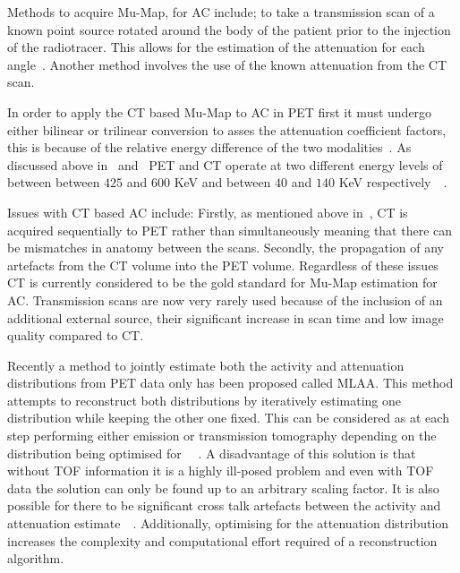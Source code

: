                 Methods to acquire \gls{Mu-Map}, for \gls{AC} include; to take a transmission scan of a known point source rotated around the body of the patient prior to the injection of the radiotracer. This allows for the estimation of the attenuation for each angle~. Another method involves the use of the known attenuation from the \gls{CT} scan.
                
                In order to apply the \gls{CT} based \gls{Mu-Map} to \gls{AC} in \gls{PET} first it must undergo either bilinear or trilinear conversion to asses the attenuation coefficient factors, this is because of the relative energy difference of the two modalities~. As discussed above in~ and~ \gls{PET} and \gls{CT} operate at two different energy levels of between between $425$ and $600$ \gls{KeV} and between $40$ and $140$ \gls{KeV} respectively~~.
                
                Issues with \gls{CT} based \gls{AC} include: Firstly, as mentioned above in~, \gls{CT} is acquired sequentially to \gls{PET} rather than simultaneously meaning that there can be mismatches in anatomy between the scans. Secondly, the propagation of any artefacts from the \gls{CT} volume into the \gls{PET} volume. Regardless of these issues \gls{CT} is currently considered to be the gold standard for \gls{Mu-Map} estimation for \gls{AC}. Transmission scans are now very rarely used because of the inclusion of an additional external source, their significant increase in scan time and low image quality compared to \gls{CT}. 
                
                Recently a method to jointly estimate both the activity and attenuation distributions from \gls{PET} data only has been proposed called \gls{MLAA}. This method attempts to reconstruct both distributions by iteratively estimating one distribution while keeping the other one fixed. This can be considered as at each step performing either emission or transmission tomography depending on the distribution being optimised for%
                ~~. A disadvantage of this solution is that without \gls{TOF} information it is a highly ill-posed problem and even with \gls{TOF} data the solution can only be found up to an arbitrary scaling factor. It is also possible for there to be significant cross talk artefacts between the activity and attenuation estimate~~. Additionally, optimising for the attenuation distribution increases the complexity and computational effort required of a reconstruction algorithm.
                
